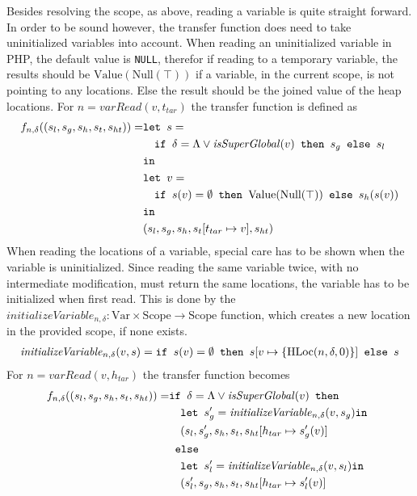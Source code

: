 Besides resolving the scope, as above, reading a variable is quite straight forward. In order to be sound however, the transfer function does need to take uninitialized variables into account. When reading an uninitialized variable in PHP, the default value is \texttt{NULL}, therefor if reading to a temporary variable, the results should be $\text{Value}(\text{Null}(\top))$ if a variable, in the current scope, is not pointing to any locations. Else the result should be the joined value of the heap locations. For $n = \mathit{varRead}(v,t_{tar})$ the transfer function is defined as
\begin{align}
f_{n, \delta} ((s_l,s_g,s_h,s_t, s_{ht})) = &\texttt{let } s = \notag\\
                                            &\quad\texttt{if }\delta = \Lambda \vee \mathit{isSuperGlobal}(v)\texttt{ then } s_g \texttt{ else } s_l\notag\\
                                            & \texttt{in }\notag\\
                                            &\texttt{let } v = \notag\\
                                            &\quad\texttt{if }s(v) = \emptyset\texttt{ then } \text{Value}(\text{Null}(\top)) \texttt{ else } s_h(s(v))\notag\\
                                            & \texttt{in }\notag\\
                                            &(s_l,s_g,s_h,s_t[t_{tar}\mapsto v], s_{ht})
\end{align}
When reading the locations of a variable, special care has to be shown when the variable is uninitialized. Since reading the same variable twice, with no intermediate modification, must return the same locations, the variable has to be initialized when first read. This is done by the $\mathit{initializeVariable}_{n,\delta} : \text{Var}\times\text{Scope}\rightarrow \text{Scope}$ function, which creates a new location in the provided scope, if none exists. 
\begin{align}
\mathit{initializeVariable}_{n, \delta}(v,s) = \texttt{if }s(v) = \emptyset\texttt{ then } s[v\mapsto \{\text{HLoc}(n,\delta, 0)\}] \texttt{ else } s
\end{align}
For $n = \mathit{varRead}(v,h_{tar})$ the transfer function becomes
\begin{align}
f_{n, \delta} ((s_l,s_g,s_h,s_t, s_{ht})) = &\texttt{if }\delta= \Lambda \vee \mathit{isSuperGlobal}(v)\texttt{ then } \notag\\
                                            &\quad\texttt{let }  s_g' = \mathit{initializeVariable}_{n,\delta}(v,s_g) \texttt{in }\notag\\
                                            &\quad (s_l, s_g', s_h, s_t, s_{ht}[h_{tar}\mapsto s_g'(v)]\notag\\
                                            & \texttt{ else } \notag\\
                                            &\quad\texttt{let }  s_l' = \mathit{initializeVariable}_{n,\delta}(v,s_l) \texttt{in }\notag\\
                                            &\quad (s_l', s_g, s_h, s_t, s_{ht}[h_{tar}\mapsto s_l'(v)]\notag\\
                                            &
\end{align}

